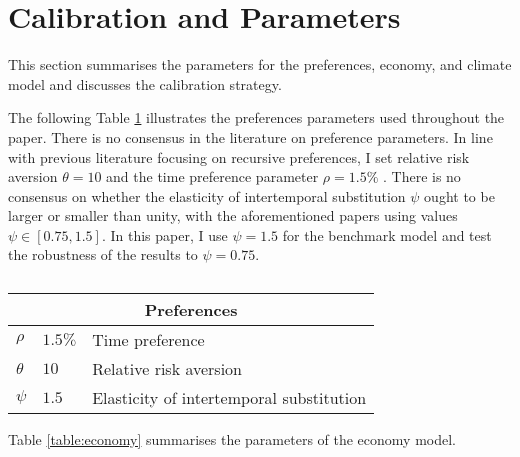 \documentclass[../../main.tex]{subfiles}
\begin{document}
\section{Calibration and Parameters} \label{appendix:calibration}

This section summarises the parameters for the preferences, economy, and climate model and discusses the calibration strategy.

The following Table \ref{table:preferences} illustrates the preferences parameters used throughout the paper. There is no consensus in the literature on preference parameters. In line with previous literature focusing on recursive preferences, I set relative risk aversion $\theta = 10$ \citep{ackerman_epsteinzin_2013,crost_optimal_2013,lontzek_stochastic_2015} and the time preference parameter $\rho = 1.5\%$ \citep{nordhaus_estimates_2014}. There is no consensus on whether the elasticity of intertemporal substitution $\psi$ ought to be larger or smaller than unity, with the aforementioned papers using values $\psi \in [0.75, 1.5]$. In this paper, I use $\psi = 1.5$ for the benchmark model and test the robustness of the results to $\psi = 0.75$.

\begin{table}[htbp]
    \centering
    \begin{tabular}{ |p{1cm}||p{3cm}|p{8cm}|}
        \hline
        \multicolumn{3}{|c|}{Preferences} \\
        \hline
        $\rho$ & $1.5\%$ & Time preference \\
        $\theta$ & $10$ & Relative risk aversion \\
        $\psi$ & $1.5$ & Elasticity of intertemporal substitution \\
        \hline
    \end{tabular}
    \caption{}
    \label{table:preferences}
\end{table}

Table \ref{table:economy} summarises the parameters of the economy model. 
\end{document}
